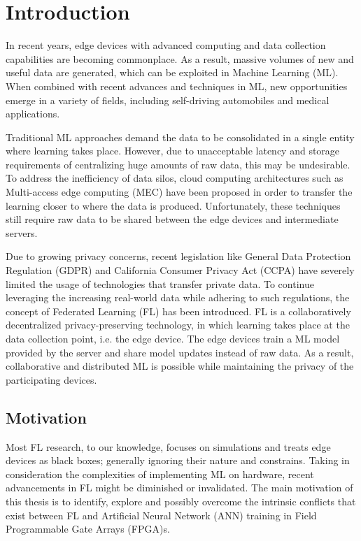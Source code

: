 \chapter{Introduction}
\label{Chapter-Introduction}

In recent years, edge devices with advanced computing and data collection capabilities are becoming commonplace. As a result, massive volumes of new and useful data are generated, which can be exploited in Machine Learning (ML). When combined with recent advances and techniques in ML, new opportunities emerge in a variety of fields, including self-driving automobiles and medical applications. 

Traditional ML approaches demand the data to be consolidated in a single entity where learning takes place. However, due to unacceptable latency and storage requirements of centralizing huge amounts of raw data, this may be undesirable. To address the inefficiency of data silos, cloud computing architectures such as Multi-access edge computing (MEC) \cite{MEC} have been proposed in order to transfer the learning closer to where the data is produced. Unfortunately, these techniques still require raw data to be shared between the edge devices and intermediate servers.

Due to growing privacy concerns, recent legislation like General Data Protection Regulation (GDPR) \cite{GDPR} and California Consumer Privacy Act (CCPA) \cite{CCPA} have severely limited the usage of technologies that transfer private data. To continue leveraging the increasing real-world data while adhering to such regulations, the concept of Federated Learning (FL) \cite{FL-original-paper} has been introduced. FL is a collaboratively decentralized privacy-preserving technology, in which learning takes place at the data collection point, i.e. the edge device. The edge devices train a ML model provided by the server and share model updates instead of raw data. As a result, collaborative and distributed ML is possible while maintaining the privacy of the participating devices.

\section{Motivation}

Most FL research, to our knowledge, focuses on simulations and treats edge devices as black boxes; generally ignoring their nature and constrains. Taking in consideration the complexities of implementing ML on hardware, recent advancements in FL might be diminished or invalidated. The main motivation of this thesis is to identify, explore and possibly overcome the intrinsic conflicts that exist between FL and Artificial Neural Network (ANN) training in Field Programmable Gate Arrays (FPGA)s. %

